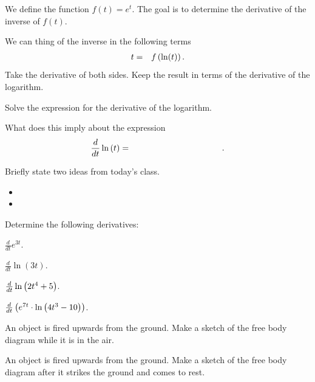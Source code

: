 \begin{problem}
\item We define the function $f(t)=e^t$. The goal is to determine the
  derivative of the inverse of $f(t)$.
  \begin{subproblem}
  \item We can thing of the inverse in the following terms
    \begin{eqnarray*}
      t & = & f\left(\ln (t) \right).
    \end{eqnarray*}
    Take the derivative of both sides. Keep the result in terms of the
    derivative of the logarithm.
    \vfill
  \item Solve the expression for the derivative of the logarithm.
    \vfill
    \item What does this imply about the expression
    \begin{eqnarray*}
      \frac{d}{dt} \ln\lp t \rp & = & \hspace{10em}.
    \end{eqnarray*}
  \end{subproblem}

\end{problem}

\postClass

\begin{problem}
\item Briefly state two ideas from today's class.
  \begin{itemize}
  \item 
  \item 
  \end{itemize}
\item Determine the following derivatives:
  \begin{subproblem}
    \item $\frac{d}{dt} e^{3t}$.
      \vfill
    \item $\frac{d}{dt} \ln(3t)$.
      \vfill
    \item $\frac{d}{dt} \ln\left( 2t^4 + 5\right)$.
      \vfill
    \item $\frac{d}{dt} \left( e^{7t} \cdot \ln \left( 4t^3 - 10\right) \right)$.
      \vfill
  \end{subproblem}
\end{problem}


\begin{problem}
\item An object is fired upwards from the ground. Make a sketch of the
  free body diagram while it is in the air.
  \vfill

\item An object is fired upwards from the ground. Make a sketch of the
  free body diagram after it strikes the ground and comes to rest.
  \vfill

\end{problem}


